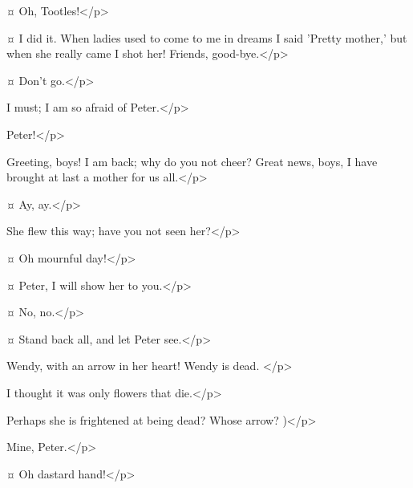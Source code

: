  ¤
Oh, Tootles!</p>

\tootlesspeaks {}¤
I did it.
When ladies used to come to me in dreams I said 'Pretty mother,' but when she really came I shot her!
Friends, good-bye.</p>

 ¤
Don't go.</p>

\tootlesspeaks
I must; I am so afraid of Peter.</p>


Peter!</p>


\peterspeaks
Greeting, boys!
I am back; why do you not cheer?
Great news, boys, I have brought at last a mother for us all.</p>

\slightlyspeaks {}¤
Ay, ay.</p>

\peterspeaks
She flew this way; have you not seen her?</p>

\secondtwinspeaks {}¤
Oh mournful day!</p>

\tootlesspeaks {}¤
Peter, I will show her to you.</p>

 ¤
No, no.</p>

\tootlesspeaks {}¤
Stand back all, and let Peter see.</p>


\peterspeaks
Wendy, with an arrow in her heart!
Wendy is dead.
</p>

\curlyspeaks
I thought it was only flowers that die.</p>

\peterspeaks
Perhaps she is frightened at being dead?
Whose arrow?
)</p>

\tootlesspeaks
Mine, Peter.</p>

\peterspeaks {}¤
Oh dastard hand!</p>

